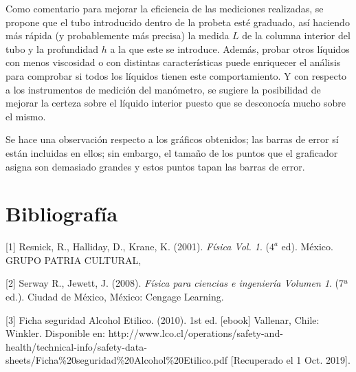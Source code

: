 \documentclass[a4paper]{article}
\begin{document}
Como comentario para mejorar la eficiencia de las mediciones realizadas, se propone que el tubo introducido dentro de la probeta esté graduado, así haciendo más rápida (y probablemente más precisa) la medida $L$ de la columna interior del tubo y la profundidad $h$ a la que este se introduce. Además, probar otros líquidos con menos viscosidad o con distintas características puede enriquecer el análisis para comprobar si todos los líquidos tienen este comportamiento. Y con respecto a los instrumentos de medición del manómetro, se sugiere la posibilidad de mejorar la certeza sobre el líquido interior puesto que se desconocía mucho sobre el mismo.

Se hace una observación respecto a los gráficos obtenidos; las barras de error sí están incluidas en ellos; sin embargo, el tamaño de los puntos que el graficador asigna son demasiado grandes y estos puntos tapan las barras de error.

\section*{Bibliografía}
[1] Resnick, R., Halliday, D., Krane, K. (2001). \textit{Física Vol. 1}. ($4^a$ ed). México. GRUPO PATRIA CULTURAL,

[2] Serway R., Jewett, J. (2008). \textit{Física para ciencias e ingeniería Volumen 1}. (7ª ed.). Ciudad de México, México: Cengage Learning.

[3] Ficha seguridad Alcohol Etilico. (2010). 1st ed. [ebook] Vallenar, Chile: Winkler. Disponible en: http://www.lco.cl/operations/safety-and-health/technical-info/safety-data-sheets/Ficha\%20seguridad\%20Alcohol\%20Etilico.pdf [Recuperado el 1 Oct. 2019].
\end{document}
